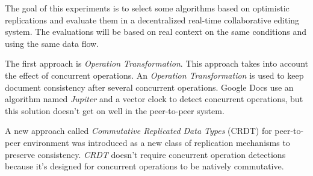  The goal of this experiments is to select some algorithms based on optimistic replications and evaluate them in a decentralized real-time collaborative editing system. The evaluations will be based on real context on the same conditions and using the same data flow.

The first approach is \emph{Operation Transformation}. This approach takes into account the effect of concurrent operations. An \emph{Operation Transformation} is used to keep document consistency after several concurrent operations. Google Docs use an algorithm named \emph{Jupiter} and a vector clock to detect concurrent operations, but this solution doesn’t get on well in the peer-to-peer system.

A new approach called \emph{Commutative Replicated Data Types} (CRDT) for peer-to-peer environment was introduced as a new class of replication mechanisms to preserve consistency. \emph{CRDT} doesn't require concurrent operation detections because it's designed for concurrent operations to be natively commutative.